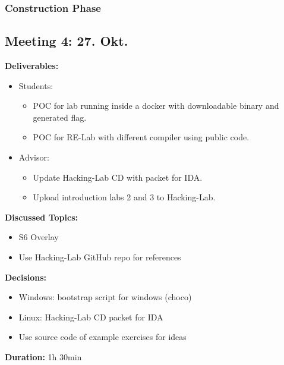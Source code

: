 \newpage
\subsubsection*{Construction Phase}
\subsection*{Meeting 4: 27. Okt.}
\textbf{Deliverables:} 
\begin{itemize}
    \item Students:
    \begin{itemize}
        \item POC for lab running inside a docker with downloadable binary and generated flag.
        \item POC for RE-Lab with different compiler using public code.
    \end{itemize}
    \item Advisor:
    \begin{itemize}
        \item Update Hacking-Lab CD with packet for IDA.
        \item Upload introduction labs 2 and 3 to Hacking-Lab.
    \end{itemize}
\end{itemize}
\textbf{Discussed Topics:} 
\begin{itemize}
    \item S6 Overlay
    \item Use Hacking-Lab GitHub repo for references
\end{itemize}
\textbf{Decisions:} 
\begin{itemize}
    \item Windows: bootstrap script for windows (choco)
    \item Linux: Hacking-Lab CD packet for IDA
    \item Use source code of example exercises for ideas
\end{itemize}
\textbf{Duration:} 1h 30min

\newpage
